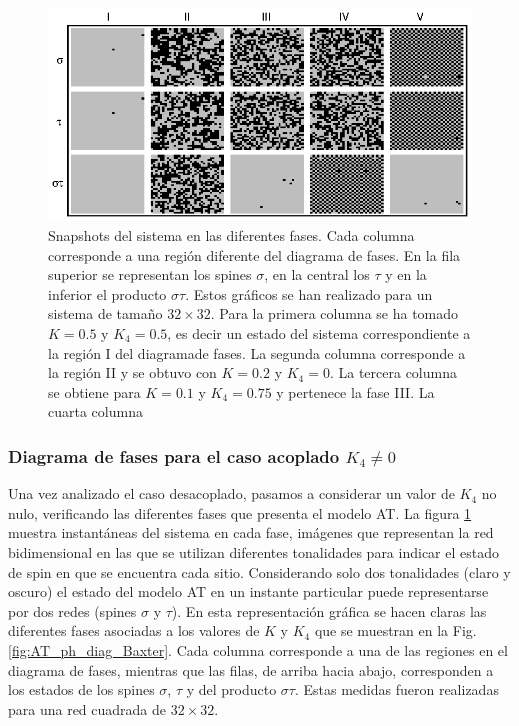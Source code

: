 \begin{figure}[h!]
	\begin{center}
		\includegraphics[scale=1]{graf/phases/multi_snaps32_horiz.eps}
	\end{center}
	\caption{Snapshots del sistema en las diferentes fases. Cada columna corresponde a una región diferente del diagrama de fases.
	En la fila superior se representan los spines $\sigma$, en la central los $\tau$ y en la inferior el producto $\sigma\tau$.
	Estos gráficos se han realizado para un sistema de tamaño $32\times 32$. Para la primera columna se ha tomado $K=0.5$ y $K_{4}=0.5$,
	es decir un estado del sistema correspondiente a la región I del diagramade fases. La segunda columna corresponde a la región II y se obtuvo con $K=0.2$ y $K_{4}=0$.
	La tercera columna se obtiene para $K=0.1$ y $K_{4}=0.75$ y pertenece la fase III. La cuarta columna }
	\label{fig:snaps_multi}
\end{figure} 

\subsubsection{Diagrama de fases para el caso acoplado $K_{4}\neq 0$}

Una vez analizado el caso desacoplado, pasamos a considerar un valor de $K_{4}$ no nulo, verificando las diferentes fases que presenta el modelo AT.
La figura \ref{fig:snaps_multi} muestra instantáneas del sistema en cada fase, imágenes que representan la red bidimensional en las que se utilizan diferentes tonalidades
 para indicar el estado de spin en que se encuentra cada sitio. Considerando solo dos tonalidades (claro y oscuro) el estado del modelo AT en un instante particular
 puede representarse por dos redes (spines $\sigma$ y $\tau$). En esta representación gráfica se hacen claras las diferentes fases asociadas a los valores de $K$ y $K_{4}$
 que se muestran en la Fig. \ref{fig:AT_ph_diag_Baxter}.
Cada columna corresponde a una de las regiones en el diagrama de fases, mientras que las filas, de arriba hacia abajo, corresponden a los estados de los spines
 $\sigma$, $\tau$ y del producto $\sigma\tau$. Estas medidas fueron realizadas para una red cuadrada de $32\times 32$.\\

